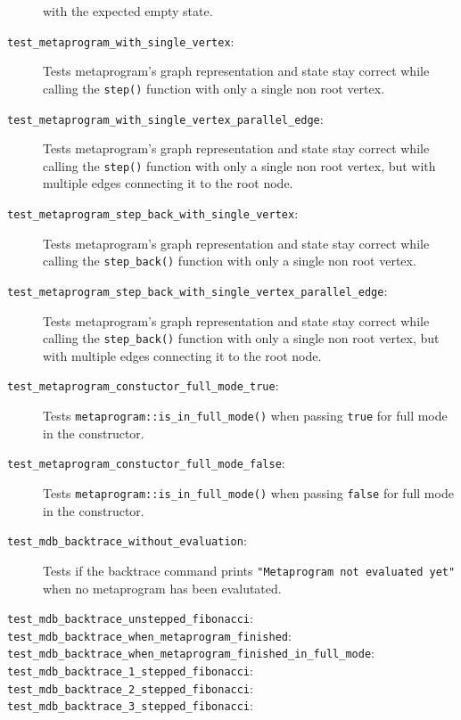 \begin{description}
        with the expected empty state.
    \item[\texttt{test\_metaprogram\_with\_single\_vertex}:]
        Tests metaprogram's graph representation and state stay correct while
        calling the \texttt{step()} function with only a single non root
        vertex.
    \item[\texttt{test\_metaprogram\_with\_single\_vertex\_parallel\_edge}:]
        Tests metaprogram's graph representation and state stay correct while
        calling the \texttt{step()} function with only a single non root
        vertex, but with multiple edges connecting it to the root node.
    \item[\texttt{test\_metaprogram\_step\_back\_with\_single\_vertex}:]
        Tests metaprogram's graph representation and state stay correct while
        calling the \texttt{step\_back()} function with only a single non root
        vertex.
    \item[\texttt{test\_metaprogram\_step\_back\_with\_single\_vertex\_parallel\_edge}:]
        Tests metaprogram's graph representation and state stay correct while
        calling the \texttt{step\_back()} function with only a single non root
        vertex, but with multiple edges connecting it to the root node.
    \item[\texttt{test\_metaprogram\_constuctor\_full\_mode\_true}:]
        Tests \texttt{metaprogram::is\_in\_full\_mode()} when passing
        \texttt{true} for full mode in the constructor.
    \item[\texttt{test\_metaprogram\_constuctor\_full\_mode\_false}:]
        Tests \texttt{metaprogram::is\_in\_full\_mode()} when passing
        \texttt{false} for full mode in the constructor.
    \item[\texttt{test\_mdb\_backtrace\_without\_evaluation}:]
        Tests if the backtrace command prints
        \texttt{"Metaprogram not evaluated yet"} when no metaprogram has been
        evalutated.
    \item[\texttt{test\_mdb\_backtrace\_unstepped\_fibonacci}:]
    \item[\texttt{test\_mdb\_backtrace\_when\_metaprogram\_finished}:]
    \item[\texttt{test\_mdb\_backtrace\_when\_metaprogram\_finished\_in\_full\_mode}:]
    \item[\texttt{test\_mdb\_backtrace\_1\_stepped\_fibonacci}:]
    \item[\texttt{test\_mdb\_backtrace\_2\_stepped\_fibonacci}:]
    \item[\texttt{test\_mdb\_backtrace\_3\_stepped\_fibonacci}:]

\end{description}
